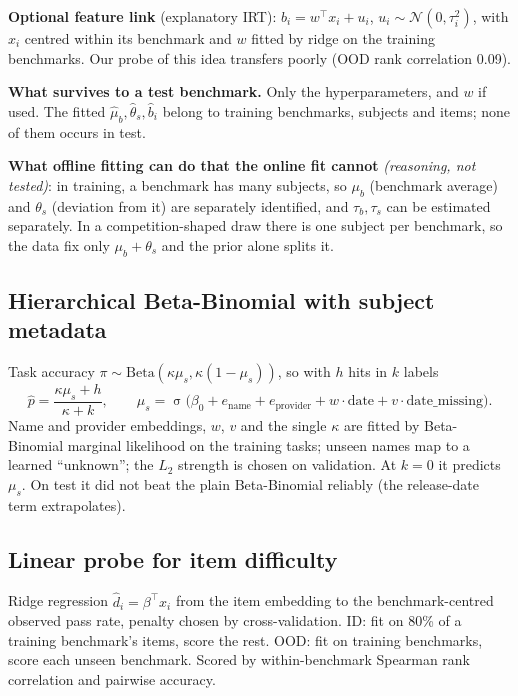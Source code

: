 \documentclass[10pt]{article}
\newcommand{\reasoning}{\textcolor{red!60!black}{\emph{(reasoning, not tested)}}}
\newcommand{\sig}{\operatorname{\sigma}}
\begin{document}
\textbf{Optional feature link} (explanatory IRT): $b_i=w^\top x_i+u_i$, $u_i\sim\mathcal N(0,\tau_i^2)$, with $x_i$ centred within its benchmark and $w$ fitted by ridge on the training benchmarks. Our probe of this idea transfers poorly (OOD rank correlation 0.09).

\textbf{What survives to a test benchmark.} Only the hyperparameters, and $w$ if used. The fitted $\hat\mu_b,\hat\theta_s,\hat b_i$ belong to training benchmarks, subjects and items; none of them occurs in test.

\textbf{What offline fitting can do that the online fit cannot} \reasoning{}: in training, a benchmark has many subjects, so $\mu_b$ (benchmark average) and $\theta_s$ (deviation from it) are separately identified, and $\tau_b,\tau_s$ can be estimated separately. In a competition-shaped draw there is one subject per benchmark, so the data fix only $\mu_b+\theta_s$ and the prior alone splits it.

\subsection{Hierarchical Beta-Binomial with subject metadata \quad [built]}
Task accuracy $\pi\sim\mathrm{Beta}(\kappa\mu_s,\kappa(1-\mu_s))$, so with $h$ hits in $k$ labels
\begin{equation}
\hat p=\frac{\kappa\mu_s+h}{\kappa+k},\qquad
\mu_s=\sig\big(\beta_0+e_{\text{name}}+e_{\text{provider}}+w\cdot\text{date}+v\cdot\text{date\_missing}\big).
\end{equation}
Name and provider embeddings, $w$, $v$ and the single $\kappa$ are fitted by Beta-Binomial marginal likelihood on the training tasks; unseen names map to a learned ``unknown''; the $L_2$ strength is chosen on validation. At $k=0$ it predicts $\mu_s$. On test it did not beat the plain Beta-Binomial reliably (the release-date term extrapolates).

\subsection{Linear probe for item difficulty }
Ridge regression $\hat d_i=\beta^\top x_i$ from the item embedding to the benchmark-centred observed pass rate, penalty chosen by cross-validation. ID: fit on 80\% of a training benchmark's items, score the rest. OOD: fit on training benchmarks, score each unseen benchmark. Scored by within-benchmark Spearman rank correlation and pairwise accuracy.
\end{document}
